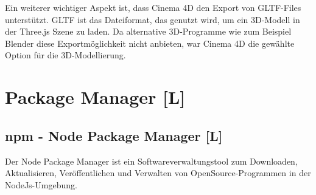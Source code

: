Ein weiterer wichtiger Aspekt ist, dass Cinema 4D den Export von GLTF-Files unterstützt. GLTF ist das Dateiformat, das genutzt wird, um ein 3D-Modell in der Three.js Szene zu laden. Da alternative 3D-Programme wie zum Beispiel Blender diese Exportmöglichkeit nicht anbieten, war Cinema 4D die gewählte Option für die 3D-Modellierung.   



\section{Package Manager [L]}
\subsection{npm - Node Package Manager [L]}
Der Node Package Manager ist ein Softwareverwaltungstool zum Downloaden, Aktualisieren, Veröffentlichen und Verwalten von OpenSource-Programmen in der NodeJs-Umgebung. \cite{whatNpm} \cite{AboutNpm}


